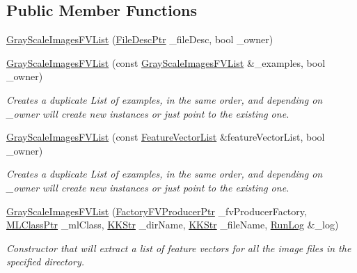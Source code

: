 \subsection*{Public Member Functions}
\begin{DoxyCompactItemize}
\item 
\hyperlink{class_k_k_m_l_l_1_1_gray_scale_images_f_v_list_aabed2fbe6de7f052cc63dc941a863372}{Gray\+Scale\+Images\+F\+V\+List} (\hyperlink{namespace_k_k_m_l_l_aa0d0b6ab4ec18868a399b8455b05d914}{File\+Desc\+Ptr} \+\_\+file\+Desc, bool \+\_\+owner)
\item 
\hyperlink{class_k_k_m_l_l_1_1_gray_scale_images_f_v_list_ad45318b3947251de7f11b64365393130}{Gray\+Scale\+Images\+F\+V\+List} (const \hyperlink{class_k_k_m_l_l_1_1_gray_scale_images_f_v_list}{Gray\+Scale\+Images\+F\+V\+List} \&\+\_\+examples, bool \+\_\+owner)
\begin{DoxyCompactList}\small\item\em Creates a duplicate List of examples, in the same order, and depending on \textquotesingle{}\+\_\+owner\textquotesingle{} will create new instances or just point to the existing one. \end{DoxyCompactList}\item 
\hyperlink{class_k_k_m_l_l_1_1_gray_scale_images_f_v_list_aaefe487e21d87e6925a667d4b39e4bcc}{Gray\+Scale\+Images\+F\+V\+List} (const \hyperlink{class_k_k_m_l_l_1_1_feature_vector_list}{Feature\+Vector\+List} \&feature\+Vector\+List, bool \+\_\+owner)
\begin{DoxyCompactList}\small\item\em Creates a duplicate List of examples, in the same order, and depending on \textquotesingle{}\+\_\+owner\textquotesingle{} will create new instances or just point to the existing one. \end{DoxyCompactList}\item 
\hyperlink{class_k_k_m_l_l_1_1_gray_scale_images_f_v_list_ae4e9383de5709ac21b15ce6298f68b63}{Gray\+Scale\+Images\+F\+V\+List} (\hyperlink{namespace_k_k_m_l_l_a82812d1feb85a6cff72d059bc67bb90e}{Factory\+F\+V\+Producer\+Ptr} \+\_\+fv\+Producer\+Factory, \hyperlink{namespace_k_k_m_l_l_ac272393853d59e72e8456f14cd6d8c23}{M\+L\+Class\+Ptr} \+\_\+ml\+Class, \hyperlink{class_k_k_b_1_1_k_k_str}{K\+K\+Str} \+\_\+dir\+Name, \hyperlink{class_k_k_b_1_1_k_k_str}{K\+K\+Str} \+\_\+file\+Name, \hyperlink{class_k_k_b_1_1_run_log}{Run\+Log} \&\+\_\+log)
\begin{DoxyCompactList}\small\item\em Constructor that will extract a list of feature vectors for all the image files in the specified directory. \end{DoxyCompactList}\item 

\end{DoxyCompactItemize}
